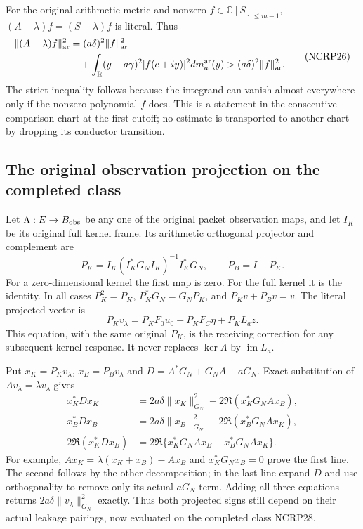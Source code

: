 \documentclass[11pt,a4paper]{article}
\begin{document}
For the original arithmetic metric and nonzero
$f\in\mathbb C[S]_{\le m-1}$,
$(A-\lambda)f=(S-\lambda)f$ is literal. Thus
\[
 \begin{split}
 \|(A-\lambda)f\|_{\rm ar}^2
 &=(a\delta)^2\|f\|_{\rm ar}^2\\
 &\quad+\int_{\mathbb R}(y-a\gamma)^2
                      |f(c+iy)|^2dm_a^{\rm ar}(y)
 >(a\delta)^2\|f\|_{\rm ar}^2 .
 \end{split}                                                     \tag{NCRP26}
\]
The strict inequality follows because the integrand can vanish
almost everywhere only if the nonzero polynomial $f$ does.
This is a statement in the consecutive comparison chart at the
first cutoff; no estimate is transported to another chart by
dropping its conductor transition.

\subsection{The original observation projection on the completed class}

Let $\Lambda:E\to B_{\rm obs}$ be any one of the original packet
observation maps, and let $I_K$ be its original full kernel frame.
Its arithmetic orthogonal projector and complement are
\[
 P_K=I_K(I_K^*G_NI_K)^{-1}I_K^*G_N,\qquad P_B=I-P_K.
 \tag{NCRP27}
\]
For a zero-dimensional kernel the first map is zero. For the full
kernel it is the identity. In all cases
$P_K^2=P_K$, $P_K^*G_N=G_NP_K$, and
$P_Kv+P_Bv=v$.
The literal projected vector is
\[
 P_Kv_\lambda
  =P_KF_0u_0+P_KF_C\eta+P_KL_az.
 \tag{NCRP28}
\]
This equation, with the same original $P_K$, is the receiving
correction for any subsequent kernel response. It never replaces
$\ker\Lambda$ by $\operatorname{im}L_a$.

Put $x_K=P_Kv_\lambda$, $x_B=P_Bv_\lambda$ and
$D=A^*G_N+G_NA-aG_N$. Exact substitution of
$Av_\lambda=\lambda v_\lambda$ gives
\[
 \begin{split}
 x_K^*Dx_K
   &=2a\delta\|x_K\|_{G_N}^2
                    -2\Re(x_K^*G_NAx_B),\\
 x_B^*Dx_B
   &=2a\delta\|x_B\|_{G_N}^2
                    -2\Re(x_B^*G_NAx_K),\\
 2\Re(x_K^*Dx_B)
   &=2\Re\{x_K^*G_NAx_B+x_B^*G_NAx_K\}.
 \end{split}                                                     \tag{NCRP29}
\]
For example, $Ax_K=\lambda(x_K+x_B)-Ax_B$ and
$x_K^*G_Nx_B=0$ prove the first line. The second follows by
the other decomposition; in the last line expand $D$ and use
orthogonality to remove only its actual $aG_N$ term.
Adding all three equations returns
$2a\delta\|v_\lambda\|_{G_N}^2$ exactly.
Thus both projected signs still depend on their actual leakage
pairings, now evaluated on the completed class NCRP28.
\end{document}
